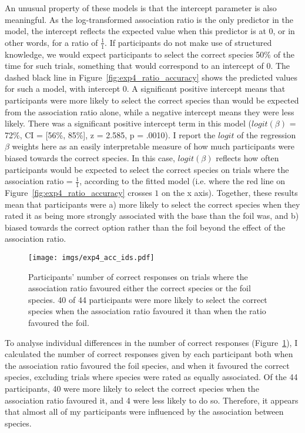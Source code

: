 An unusual property of these models is that
the intercept parameter is also meaningful.
As the log-transformed association ratio is the only predictor in the model,
the intercept reflects the expected value
when this predictor is at 0, or in other words, for a ratio of $\frac{1}{1}$.
If participants do not make use of structured knowledge,
we would expect participants to select the correct species
50\% of the time for such trials, something that would correspond to an intercept of 0.
The dashed black line in Figure~\ref{fig:exp4_ratio_accuracy}
shows the predicted values for such a model, with intercept 0.
A significant positive intercept means that
participants were more likely to select the correct species
than would be expected from the association ratio alone,
while a negative intercept means they were less likely.
There was a significant positive intercept term in this model
($logit(\beta)$ = 72\%, CI = [56\%, 85\%], z = 2.585, p = .0010).
I report the $logit$ of the regression $\beta$ weights here
as an easily interpretable measure of how much participants
were biased towards the correct species.
In this case, $logit(\beta)$ reflects how often
participants would be expected to select the correct species
on trials where the association ratio = $\frac{1}{1}$,
according to the fitted model
(i.e. where the red line on Figure~\ref{fig:exp4_ratio_accuracy}
crosses $1$ on the x axis).
Together, these results mean that participants were
a) more likely to select the correct species when
they rated it as being more strongly associated with the base
than the foil was, and
b) biased towards the correct option rather than the foil
beyond the effect of the association ratio.

\begin{figure}[h]
  \centering
  \texttt{[image: imgs/exp4\_acc\_ids.pdf]}
  \caption[Proportion of correct responses
    given by each participant, by association ratio,
    in Experiment 4]{
    Participants' number of correct responses
    on trials where the association ratio favoured either
    the correct species or the foil species.
    40 of 44 participants were more likely to select the correct species
    when the association ratio favoured it
    than when the ratio favoured the foil.
    \label{fig:exp4_acc_ids} }
\end{figure}

To analyse individual differences in the number of correct responses
(Figure~\ref{fig:exp4_acc_ids}),
I calculated the number of correct responses given by each participant
both when the association ratio favoured the foil species,
and when it favoured the correct species,
excluding trials where species were rated as equally associated.
Of the 44 participants, 40 were more likely to select the correct species
when the association ratio favoured it,
and 4 were less likely to do so.
Therefore, it appears that almost all of my participants
were influenced by the association between species.

